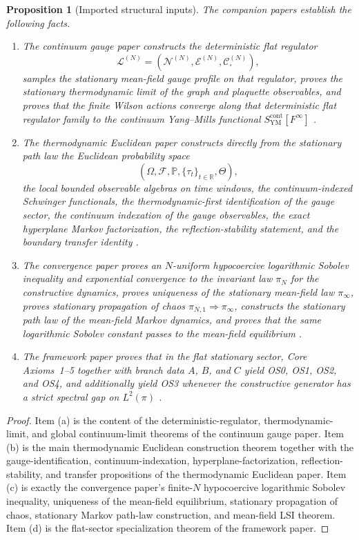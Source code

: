 \documentclass[11pt]{article}
\newtheorem{proposition}[theorem]{Proposition}
\theoremstyle{definition}
\theoremstyle{remark}
\newcommand{\R}{\mathbb R}
\newcommand{\mcN}{\mathcal N}
\newcommand{\mcE}{\mathcal E}
\begin{document}
\begin{proposition}[Imported structural inputs]
\label{prop:imports}
The companion papers establish the following facts.
\begin{enumerate}[label=\textnormal{(\alph*)},leftmargin=1.5em]
\item The continuum gauge paper constructs the deterministic flat regulator
\[
\mathcal L^{(N)}=(\mcN^{(N)},\mcE^{(N)},\mathcal C_\square^{(N)}),
\]
samples the stationary mean-field gauge profile on that regulator, proves the
stationary thermodynamic limit of the graph and plaquette observables, and
proves that the finite Wilson actions converge along that deterministic flat
regulator family to the continuum Yang--Mills functional
$S_{\mathrm{YM}}^{\mathrm{cont}}[F^\infty]$ \cite{lattice}.
\item The thermodynamic Euclidean paper constructs directly from the stationary
path law the Euclidean probability space
\[
(\Omega,\mathcal F,\mathbb P,\{\tau_t\}_{t\in\R},\Theta),
\]
the local bounded observable algebras on time windows, the continuum-indexed
Schwinger functionals, the thermodynamic-first identification of the gauge
sector, the continuum indexation of the gauge observables, the exact
hyperplane Markov factorization, the reflection-stability statement, and the
boundary transfer identity \cite{quantization}.
\item The convergence paper proves an $N$-uniform hypocoercive logarithmic
Sobolev inequality and exponential convergence to the invariant law $\pi_N$ for
the constructive dynamics, proves uniqueness of the stationary mean-field law
$\pi_\infty$, proves stationary propagation of chaos
$\pi_{N,1}\Rightarrow \pi_\infty$, constructs the stationary path law of the
mean-field Markov dynamics, and proves that the same logarithmic Sobolev
constant passes to the mean-field equilibrium \cite{convergence}.
\item The framework paper proves that in the flat stationary sector, Core
Axioms~1--5 together with branch data $A$, $B$, and $C$ yield OS0, OS1, OS2,
and OS4, and additionally yield OS3 whenever the constructive generator has a
strict spectral gap on $L^2(\pi)$ \cite{axioms}.
\end{enumerate}
\end{proposition}

\begin{proof}
Item \textnormal{(a)} is the content of the deterministic-regulator,
thermodynamic-limit, and global continuum-limit theorems of the continuum gauge
paper.  Item \textnormal{(b)} is the main thermodynamic Euclidean construction
theorem together with the gauge-identification, continuum-indexation,
hyperplane-factorization, reflection-stability, and transfer propositions of
the thermodynamic Euclidean paper.
Item \textnormal{(c)} is exactly the convergence paper's finite-$N$
hypocoercive logarithmic Sobolev inequality, uniqueness of the mean-field
equilibrium, stationary propagation of chaos, stationary Markov path-law
construction, and mean-field LSI theorem.  Item \textnormal{(d)} is the
flat-sector specialization theorem of the framework paper.
\end{proof}
\end{document}

